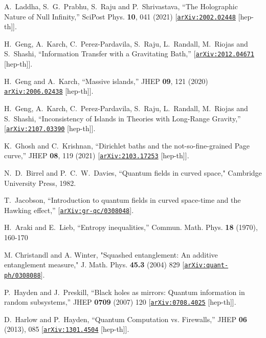 \documentclass[12pt]{article}
\newcommand \arXiv [1]{\href{http://arxiv.org/abs/#1}{\tt arXiv:#1}}
\begin{document}
\begin{thebibliography}{99}
{%
A.~Laddha, S.~G.~Prabhu, S.~Raju and P.~Shrivastava,
``The Holographic Nature of Null Infinity,''
SciPost Phys. \textbf{10}, 041 (2021)
[\arXiv{2002.02448} [hep-th]].

H.~Geng, A.~Karch, C.~Perez-Pardavila, S.~Raju, L.~Randall, M.~Riojas and S.~Shashi,
``Information Transfer with a Gravitating Bath,''
[\arXiv{2012.04671} [hep-th]].


H.~Geng and A.~Karch,
``Massive islands,''
JHEP \textbf{09}, 121 (2020)
\arXiv{2006.02438} [hep-th]].

H.~Geng, A.~Karch, C.~Perez-Pardavila, S.~Raju, L.~Randall, M.~Riojas and S.~Shashi,
``Inconsistency of Islands in Theories with Long-Range Gravity,''
[\arXiv{2107.03390} [hep-th]].

K.~Ghosh and C.~Krishnan,
``Dirichlet baths and the not-so-fine-grained Page curve,''
JHEP \textbf{08}, 119 (2021)
[\arXiv{2103.17253} [hep-th]].

N.~D.~Birrel and P.~C.~W.~Davies, ``Quantum fields in curved space," Cambridge University Press, 1982.


T.~Jacobson,
``Introduction to quantum fields in curved space-time and the Hawking effect,''
[\arXiv{gr-qc/0308048}].

H.~Araki and E.~Lieb,
``Entropy inequalities,''
Commun. Math. Phys. \textbf{18} (1970), 160-170


M. Christandl and A. Winter, 
"Squashed entanglement: An additive entanglement measure,"
J. Math. Phys. \textbf{45.3} (2004) 829
[\arXiv{quant-ph/0308088}].


  P.~Hayden and J.~Preskill,
  ``Black holes as mirrors: Quantum information in random subsystems,''
  JHEP {\bf 0709} (2007) 120
  [\arXiv{0708.4025} [hep-th]].

D.~Harlow and P.~Hayden,
``Quantum Computation vs. Firewalls,''
JHEP \textbf{06} (2013), 085
[\arXiv{1301.4504} [hep-th]]. 


}
\end{thebibliography}
\end{document}
